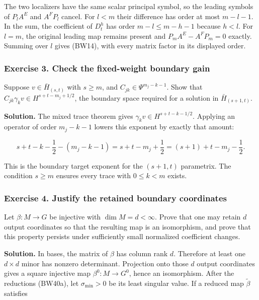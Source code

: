 \documentclass[
  11pt,
]{article}
\begin{document}
The two localizers have the same scalar principal symbol, so the leading
symbols of \(P_lA^E\) and \(A^FP_l\) cancel. For \(l<m\) their
difference has order at most \(m-l-1\). In the sum, the coefficient of
\(D_t^h\) has order \(m-l\leq m-h-1\) because \(h<l\). For \(l=m\), the
original leading map remains present and \(P_mA^E-A^FP_m=0\) exactly.
Summing over \(l\) gives (BW14), with every matrix factor in its
displayed order.

\subsubsection{Exercise 3. Check the fixed-weight boundary
gain}\label{exercise-3.-check-the-fixed-weight-boundary-gain}

Suppose \(v\in\bar H_{(s,t)}\) with \(s\geq m\), and
\(C_{jk}\in\Psi^{m_j-k-1}\). Show that
\(C_{jk}\gamma_kv\in H^{s+t-m_j+1/2}\), the boundary space required for
a solution in \(\bar H_{(s+1,t)}\).

\textbf{Solution.} The mixed trace theorem gives
\(\gamma_kv\in H^{s+t-k-1/2}\). Applying an operator of order
\(m_j-k-1\) lowers this exponent by exactly that amount:

\[
 s+t-k-\frac12-(m_j-k-1)
 =s+t-m_j+\frac12
 =(s+1)+t-m_j-\frac12.
 \tag{BW51}
\]

This is the boundary target exponent for the \((s+1,t)\) parametrix. The
condition \(s\geq m\) ensures every trace with \(0\leq k<m\) exists.

\subsubsection{Exercise 4. Justify the retained boundary
coordinates}\label{exercise-4.-justify-the-retained-boundary-coordinates}

Let \(\beta:M\to G\) be injective with \(\dim M=d<\infty\). Prove that
one may retain \(d\) output coordinates so that the resulting map is an
isomorphism, and prove that this property persists under sufficiently
small normalized coefficient changes.

\textbf{Solution.} In bases, the matrix of \(\beta\) has column rank
\(d\). Therefore at least one \(d\times d\) minor has nonzero
determinant. Projection onto those \(d\) output coordinates gives a
square injective map \(\beta^0:M\to G^0\), hence an isomorphism. After
the reductions (BW40a), let \(\sigma_{\min}>0\) be its least singular
value. If a reduced map \(\widetilde\beta\) satisfies
\end{document}
